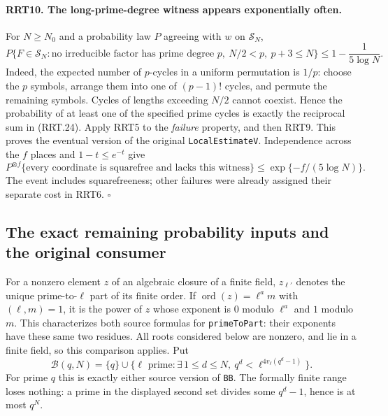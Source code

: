 \documentclass[11pt,a4paper]{article}
\numberwithin{equation}{section}
\theoremstyle{remark}\newtheorem{remark}[theorem]{Remark}
\begin{document}
\paragraph{RRT10. The long-prime-degree witness appears exponentially often.}
\label{claim:RRT10}
For $N\ge N_0$ and a probability law $P$ agreeing with $w$ on
$\mathcal S_N$,
\[
 P\{F\in\mathcal S_N:\text{no irreducible factor has prime degree }p,
                         \ N/2<p,\ p+3\le N\}
                   \le1-\frac1{5\log N}.
 \tag{RRT.27}
\]
Indeed, the expected number of $p$-cycles in a uniform
permutation is $1/p$: choose the $p$ symbols, arrange them into
one of $(p-1)!$ cycles, and permute the remaining symbols.
Cycles of lengths exceeding $N/2$ cannot coexist.  Hence the
probability of at least one of the specified prime cycles is
exactly the reciprocal sum in (RRT.24).  Apply RRT5 to the
\emph{failure} property, and then RRT9.  This proves the
eventual version of the original \texttt{Local\allowbreak Estimate\allowbreak V}.
Independence across the $f$ places and $1-t\le e^{-t}$ give
\[
 P^{\otimes f}\{\text{every coordinate is squarefree and lacks
                          this witness}\}
                       \le\exp\{-f/(5\log N)\}.
 \tag{RRT.28}
\]
The event includes squarefreeness; other failures were already
assigned their separate cost in RRT6.
\hfill$\square$

\subsection{The exact remaining probability inputs and the original consumer}

For a nonzero element $z$ of an algebraic closure of a finite
field, $z_{\ell'}$ denotes the unique prime-to-$\ell$ part of
its finite order.  If $\operatorname{ord}(z)=\ell^a m$ with
$(\ell,\allowbreak{} m)=1$, it is the power of $z$ whose exponent is $0$
modulo $\ell^a$ and $1$ modulo $m$.  This characterizes both
source formulas for \texttt{prime\allowbreak To\allowbreak Part}: their exponents have
these same two residues.  All roots considered below are
nonzero, and lie in a finite field, so this comparison applies.
Put
\[
 \mathcal B(q,\allowbreak{} N)=\{q\}\cup
 \{\ell\text{ prime}:\exists\,1\le d\le N,
                           \ q^d<\ell^{4v_\ell(q^d-1)}\}.
 \tag{RRT.29}
\]
For prime $q$ this is exactly either source version of
\texttt{BB}.  The formally finite range loses nothing: a prime
in the displayed second set divides some $q^d-1$, hence is at
most $q^N$.
\end{document}
